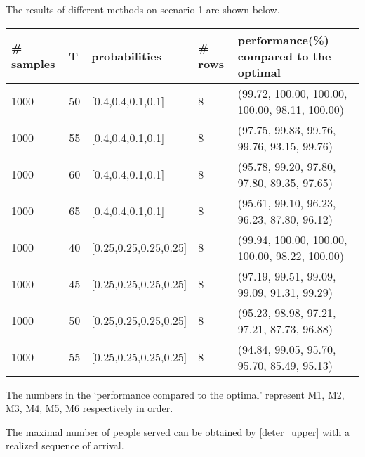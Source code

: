 


The results of different methods on scenario 1 are shown below.

\begin{table}[ht]
  \begin{tabular}{|l|l|l|l|l|}
  \hline
  \# samples & T & probabilities & \# rows & performance(\%) compared to the optimal \\
  \hline
  1000  & 50  & [0.4,0.4,0.1,0.1] & 8 & (99.72, 100.00, 100.00, 100.00, 98.11, 100.00) \\
  1000  & 55  & [0.4,0.4,0.1,0.1] & 8 & (97.75, 99.83, 99.76, 99.76, 93.15, 99.76) \\ %
  1000  & 60  & [0.4,0.4,0.1,0.1] & 8 & (95.78, 99.20, 97.80, 97.80, 89.35, 97.65) \\
  1000  & 65  & [0.4,0.4,0.1,0.1] & 8 & (95.61, 99.10, 96.23, 96.23, 87.80, 96.12) \\
  \hline
  1000  & 40  & [0.25,0.25,0.25,0.25] & 8 & (99.94, 100.00, 100.00, 100.00, 98.22, 100.00) \\
  1000  & 45  & [0.25,0.25,0.25,0.25] & 8 & (97.19, 99.51, 99.09, 99.09, 91.31, 99.29) \\
  1000  & 50  & [0.25,0.25,0.25,0.25] & 8 & (95.23, 98.98, 97.21, 97.21, 87.73, 96.88) \\
  1000  & 55  & [0.25,0.25,0.25,0.25] & 8 & (94.84, 99.05, 95.70, 95.70, 85.49, 95.13) \\
  \hline
  \end{tabular}
\end{table}
 
The numbers in the `performance compared to the optimal' represent M1, M2, M3, M4, M5, M6 respectively in order.

The maximal number of people served can be obtained by \eqref{deter_upper} with a realized sequence of arrival.


